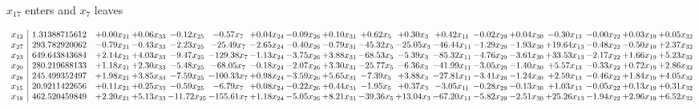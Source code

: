 \documentclass[9pt]{article}
\begin{document}
 $ x_{17} $ enters and $ x_{7} $ leaves 

 \[\begin{array}{c| c c@{\hskip 2pt} c@{\hskip 2pt} c@{\hskip 2pt} c@{\hskip 2pt} c@{\hskip 2pt} c@{\hskip 2pt} c@{\hskip 2pt} c@{\hskip 2pt} c@{\hskip 2pt} c@{\hskip 2pt} c@{\hskip 2pt} c@{\hskip 2pt} c@{\hskip 2pt} c@{\hskip 2pt} c@{\hskip 2pt} c@{\hskip 2pt} }
 x_{12}   &  1.31388715612 & +  0.00 x_{21} & +  0.06 x_{33} & -0.12 x_{25} & -0.57 x_{7} & +  0.04 x_{24} & -0.09 x_{26} & +  0.10 x_{31} & +  0.62 x_{5} & +  0.30 x_{3} & +  0.42 x_{11} & -0.02 x_{29} & +  0.04 x_{30} & -0.30 x_{13} & -0.00 x_{22} & +  0.03 x_{19} & +  0.05 x_{32}\\
 x_{27}   &  293.782920062 & -0.79 x_{21} & -0.43 x_{33} & -2.23 x_{25} & -25.49 x_{7} & -2.65 x_{24} & -0.40 x_{26} & -0.79 x_{31} & -45.32 x_{5} & -25.05 x_{3} & -46.44 x_{11} & -1.29 x_{29} & -1.93 x_{30} & + 19.64 x_{13} & -0.48 x_{22} & -0.50 x_{19} & +  2.37 x_{32}\\
 x_{23}   &  649.643843684 & +  2.14 x_{21} & +  4.03 x_{33} & -9.47 x_{25} & -129.38 x_{7} & -1.13 x_{24} & -3.75 x_{26} & +  3.88 x_{31} & -68.53 x_{5} & -5.39 x_{3} & -85.32 x_{11} & -4.76 x_{29} & -3.61 x_{30} & + 33.53 x_{13} & -2.17 x_{22} & +  1.66 x_{19} & +  5.23 x_{32}\\
 x_{20}   &  280.219688133 & +  1.18 x_{21} & +  2.30 x_{33} & -5.48 x_{25} & -68.05 x_{7} & -0.18 x_{24} & -2.07 x_{26} & +  3.30 x_{31} & -25.77 x_{5} & -6.36 x_{3} & -41.99 x_{11} & -3.05 x_{29} & -1.40 x_{30} & +  5.57 x_{13} & -0.33 x_{22} & +  0.72 x_{19} & +  2.86 x_{32}\\
 x_{28}   &  245.499352497 & +  1.98 x_{21} & +  3.85 x_{33} & -7.59 x_{25} & -100.33 x_{7} & +  0.98 x_{24} & -3.59 x_{26} & +  5.65 x_{31} & -7.39 x_{5} & +  3.88 x_{3} & -27.81 x_{11} & -3.41 x_{29} & -1.24 x_{30} & +  2.59 x_{13} & -0.46 x_{22} & +  1.84 x_{19} & +  4.05 x_{32}\\
 x_{15}   &  20.9211422656 & +  0.11 x_{21} & +  0.25 x_{33} & -0.59 x_{25} & -6.79 x_{7} & +  0.08 x_{24} & -0.22 x_{26} & +  0.44 x_{31} & -1.95 x_{5} & +  0.37 x_{3} & -3.05 x_{11} & -0.28 x_{29} & -0.13 x_{30} & +  1.03 x_{13} & -0.05 x_{22} & +  0.13 x_{19} & +  0.31 x_{32}\\
 x_{18}   &  462.520459849 & +  2.20 x_{21} & +  5.13 x_{33} & -11.72 x_{25} & -155.61 x_{7} & +  1.18 x_{24} & -5.05 x_{26} & +  8.21 x_{31} & -39.36 x_{5} & + 13.04 x_{3} & -67.20 x_{11} & -5.82 x_{29} & -2.51 x_{30} & + 25.26 x_{13} & -1.94 x_{22} & +  2.96 x_{19} & +  6.52 x_{32}\\

\end{array}\]
\end{document}
